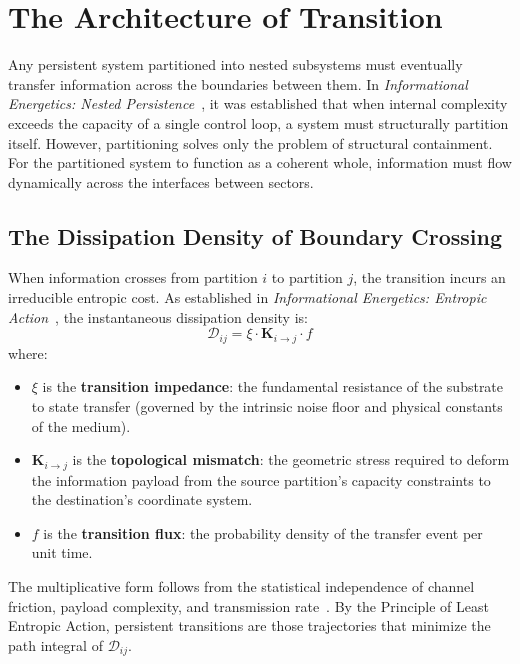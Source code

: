 \section{The Architecture of Transition}
\label{sec:architecture_of_transition}

Any persistent system partitioned into nested subsystems must eventually transfer information across the boundaries between them. In \textit{Informational Energetics: Nested Persistence}~\cite{meyer_ienested_2026}, it was established that when internal complexity exceeds the capacity of a single control loop, a system must structurally partition itself. However, partitioning solves only the problem of structural containment. For the partitioned system to function as a coherent whole, information must flow dynamically across the interfaces between sectors.

\subsection{The Dissipation Density of Boundary Crossing}

When information crosses from partition $i$ to partition $j$, the transition incurs an irreducible entropic cost. As established in \textit{Informational Energetics: Entropic Action}~\cite{meyer_ieaction_2026}, the instantaneous dissipation density is: 
$$ \mathcal{D}_{ij} = \xi \cdot \mathbf{K}_{i\to j} \cdot f $$ 
where:
\begin{itemize}
    \item $\xi$ is the \textbf{transition impedance}: the fundamental resistance of the substrate to state transfer (governed by the intrinsic noise floor and physical constants of the medium).
    \item $\mathbf{K}_{i\to j}$ is the \textbf{topological mismatch}: the geometric stress required to deform the information payload from the source partition's capacity constraints to the destination's coordinate system.
    \item $f$ is the \textbf{transition flux}: the probability density of the transfer event per unit time.
\end{itemize}

The multiplicative form follows from the statistical independence of channel friction, payload complexity, and transmission rate~\cite{meyer_ieaction_2026}. By the Principle of Least Entropic Action, persistent transitions are those trajectories that minimize the path integral of $\mathcal{D}_{ij}$.

